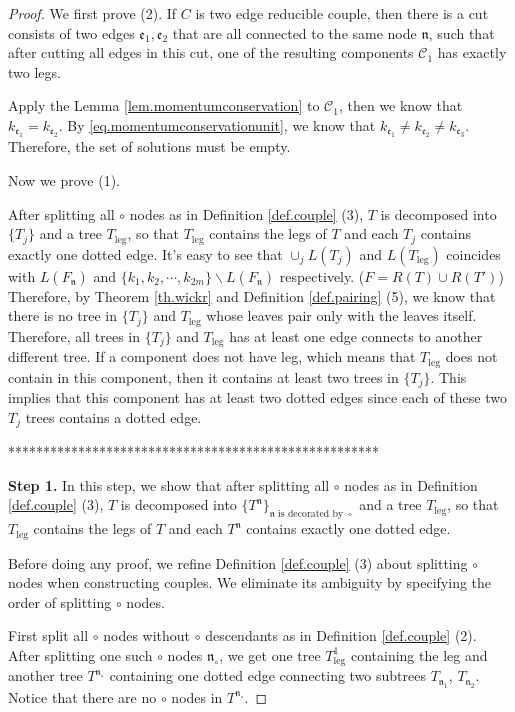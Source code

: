 \begin{proof}
We first prove (2). If $C$ is two edge reducible couple, then there is a cut consists of two edges $\mathfrak{e}_1, \mathfrak{e}_2$ that are all connected to the same node $\mathfrak{n}$, such that after cutting all edges in this cut, one of the resulting components $\mathcal{C}_1$ has exactly two legs.

Apply the Lemma \ref{lem.momentumconservation} to $\mathcal{C}_1$, then we know that $k_{\mathfrak{e}_1}=k_{\mathfrak{e}_2}$. By \ref{eq.momentumconservationunit}, we know that $k_{\mathfrak{e}_1}\ne k_{\mathfrak{e}_2}\ne k_{\mathfrak{e}_3}$. Therefore, the set of solutions must be empty. 

Now we prove (1). 

After splitting all $\circ$ nodes as in Definition \ref{def.couple} (3), $T$ is decomposed into  $\{T_j\}$ and a tree $T_{\text{leg}}$, so that $T_{\text{leg}}$ contains the legs of $T$ and each $T_j$ contains exactly one dotted edge. It's easy to see that $\cup_{j} L(T_j)$ and $L(T_{\text{leg}})$ coincides with  $L(F_{\mathfrak{n}})$ and $\{k_1,k_2,\cdots,k_{2m}\}\backslash L(F_{\mathfrak{n}})$ respectively. ($F=R(T)\cup R(T')$) Therefore, by Theorem \ref{th.wickr} and Definition \ref{def.pairing} (5), we know that there is no tree in $\{T_j\}$ and $T_{\text{leg}}$ whose leaves pair only with the leaves itself. Therefore, all trees in $\{T_j\}$ and $T_{\text{leg}}$ has at least one edge connects to another different tree. If a component does not have leg, which means that $T_{\text{leg}}$ does not contain in this component, then it contains at least two trees in $\{T_j\}$. This implies that this component has at least two dotted edges since each of these two $T_j$ trees contains a dotted edge.


*****************************************************

\textbf{Step 1.} In this step, we show that after splitting all $\circ$ nodes as in Definition \ref{def.couple} (3), $T$ is decomposed into  $\{T^{\mathfrak{n}}\}_{\mathfrak{n}\text{ is decorated by } \circ}$ and a tree $T_{\text{leg}}$, so that $T_{\text{leg}}$ contains the legs of $T$ and each $T^{\mathfrak{n}}$ contains exactly one dotted edge.

Before doing any proof, we refine Definition \ref{def.couple} (3) about splitting $\circ$ nodes when constructing couples. We eliminate its ambiguity by specifying the order of splitting $\circ$ nodes. 

First split all $\circ$ nodes without $\circ$ descendants as in Definition \ref{def.couple} (2). After splitting one such $\circ$ nodes $\mathfrak{n}_{\circ}$, we get one tree $T_{\text{leg}}^{1}$ containing the leg and another tree $T^{\mathfrak{n}_{\circ}}$ containing one dotted edge connecting two subtrees $T_{\mathfrak{n}_1}$, $T_{\mathfrak{n}_2}$. Notice that there are no $\circ$ nodes in $T^{\mathfrak{n}_{\circ}}$.


\end{proof}
